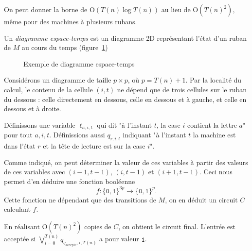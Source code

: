 \documentclass[./main]{subfiles}
\begin{document}
  \begin{rmk}
    On peut donner la borne de $\mathrm{O}(T(n) \log T(n))$ au lieu de $\mathrm{O}(T(n)^2)$, même pour des machines à plusieurs rubans.
  \end{rmk}

  \begin{defn}
    Un \textit{diagramme espace-temps} est un diagramme 2D représentant l'état d'un ruban de $M$ au cours du temps (figure~\ref{fig:space-time-diagram})
  \end{defn}

  \begin{figure}[H]
    \centering
    \caption{Exemple de diagramme espace-temps}
    \label{fig:space-time-diagram}
  \end{figure}


  \begin{prv}
    Considérons un diagramme de taille $p \times p$, où $p = T(n) + 1$.
    Par la localité du calcul, le contenu de la cellule $(i, t)$ ne dépend que de trois cellules sur le ruban du dessous : celle directement en dessous, celle en dessous et à gauche, et celle en dessous et à droite.

    Définissons une variable $\ell_{a,i,t}$ qui dit "à l'instant $t$, la case $i$ contient la lettre $a$" pour tout $a, i, t$.
    Définissions aussi $q_{r, i, t}$ indiquant "à l'instant $t$ la machine est dans l'état $r$ et la tête de lecture est sur la case $i$".

    Comme indiqué, on peut déterminer la valeur de ces variables à partir des valeurs de ces variables avec $(i-1, t-1)$, $(i, t- 1)$ et $(i+1, t - 1)$.
    Ceci nous permet d'en déduire une fonction booléenne
     \[
    f : \{\texttt{0}, \texttt{1}\}^{3p} \to \{\texttt{0}, \texttt{1}\}^p
    .\]
    Cette fonction ne dépendant que des transitions de $M$, on en déduit un circuit $C$ calculant $f$.

    En réalisant $\mathrm{O}(T(n)^2)$ copies de $C$, on obtient le circuit final.
    L'entrée est acceptée si $\bigvee_{i=0}^{T(n)} q_{q_\text{accepte}, i, T(n)}$ a pour valeur $\texttt{1}$.
  \end{prv}
\end{document}
